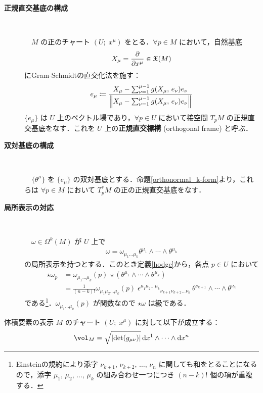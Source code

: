 \documentclass[geometry_main]{subfiles}
\begin{document}
\begin{description} 
	\item[\textbf{正規直交基底の構成}]　
	
	　$M$ の正のチャート $(U;\; x^\mu)$ をとる．$\forall p \in M$ において，自然基底
	\begin{align} 
		X_\mu = \pdv{}{x^\mu} \in \mathfrak{X}(M)
	\end{align}
	にGram-Schmidtの直交化法を施す：
	\begin{align} 
		e_\mu \coloneqq \frac{X_\mu - \sum_{\nu = 1}^{\mu - 1} g(X_\mu,\, e_\nu) e_\nu}{\norm{X_\mu - \sum_{\nu = 1}^{\mu - 1} g(X_\mu,\, e_\nu) e_\nu}}
	\end{align}
	$\{e_\mu\}$ は $U$ 上の\cinfty ベクトル場であり，$\forall p \in U$ において接空間 $T_p M$ の正規直交基底をなす．これを $U$ 上の\textbf{正規直交標構} (orthogonal frame) と呼ぶ．

	\item[\textbf{双対基底の構成}]　
	
	　$\{\theta^\mu\}$ を $\{e_\mu\}$ の双対基底とする．命題\ref{orthonormal_k-form}より，これらは $\forall p \in M$ において $T_p^*M$ の正の正規直交基底をなす．

	\item[\textbf{局所表示の対応}]　
	
	　$\omega \in \Omega^k(M)$ が $U$ 上で
	\begin{align} 
		\omega = \omega_{\mu_1 \dots \mu_k} \theta^{\mu_1} \wedge \cdots \wedge \theta^{\mu_k}
	\end{align}
	の局所表示を持つとする．このとき定義\ref{hodge}から，各点 $p \in U$ において
	\begin{align} 
		\star \omega_p &= \omega_{\mu_1 \dots \mu_k}(p)\, \star(\theta^{\mu_1} \wedge \cdots \wedge \theta^{\mu_k}) \\
		&= \frac{1}{(n-k)!} \omega_{\mu_1 \mu_2\dots \mu_k}(p)\; \epsilon^{\mu_1 \mu_2 \dots \mu_k}{}_{\nu_{k+1} \nu_{k+2} \dots \nu_{n}}\, \theta^{\nu_{k+1}} \wedge \cdots \wedge \theta^{\nu_n}
	\end{align}
	である\footnote{Einsteinの規約により添字 $\nu_{k+1},\, \nu_{k+2},\, \dots ,\, \nu_{n}$ に関しても和をとることになるので，添字 $\mu_1,\, \mu_2,\, \dots ,\, \mu_k$ の組み合わせ一つにつき $(n-k)!$ 個の項が重複する．}．$ \omega_{\mu_1 \dots \mu_k}(p)$ が\cinfty 関数なので $\star \omega$ は\cinfty 級である．
\end{description}

\begin{myprop}[label=prop.vol]{体積要素の表示}
	$M$ のチャート $(U;\; x^\mu)$ に対して以下が成立する：
	\begin{align} 
		\vol_M = \sqrt{\abs{\det(g_{\mu\nu})} } \dd{x^{1}} \wedge \cdots \wedge \dd{x^n}
	\end{align}
\end{myprop}
\end{document}
